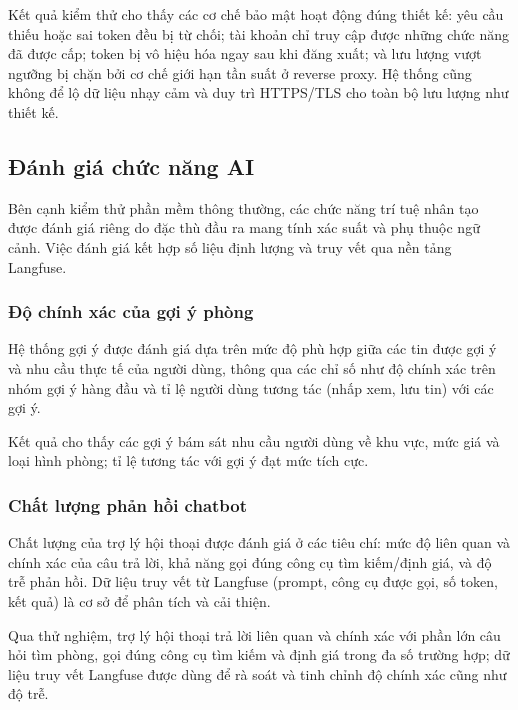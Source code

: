 Kết quả kiểm thử cho thấy các cơ chế bảo mật hoạt động đúng thiết kế: yêu cầu thiếu hoặc sai token đều bị từ chối; tài khoản chỉ truy cập được những chức năng đã được cấp; token bị vô hiệu hóa ngay sau khi đăng xuất; và lưu lượng vượt ngưỡng bị chặn bởi cơ chế giới hạn tần suất ở reverse proxy. Hệ thống cũng không để lộ dữ liệu nhạy cảm và duy trì HTTPS/TLS cho toàn bộ lưu lượng như thiết kế.

\FloatBarrier
\subsection{Đánh giá chức năng AI}

Bên cạnh kiểm thử phần mềm thông thường, các chức năng trí tuệ nhân tạo được đánh giá riêng do đặc thù đầu ra mang tính xác suất và phụ thuộc ngữ cảnh. Việc đánh giá kết hợp số liệu định lượng và truy vết qua nền tảng Langfuse.

\FloatBarrier
\subsubsection{Độ chính xác của gợi ý phòng}

Hệ thống gợi ý được đánh giá dựa trên mức độ phù hợp giữa các tin được gợi ý và nhu cầu thực tế của người dùng, thông qua các chỉ số như độ chính xác trên nhóm gợi ý hàng đầu và tỉ lệ người dùng tương tác (nhấp xem, lưu tin) với các gợi ý.

Kết quả cho thấy các gợi ý bám sát nhu cầu người dùng về khu vực, mức giá và loại hình phòng; tỉ lệ tương tác với gợi ý đạt mức tích cực.

\FloatBarrier
\subsubsection{Chất lượng phản hồi chatbot}

Chất lượng của trợ lý hội thoại được đánh giá ở các tiêu chí: mức độ liên quan và chính xác của câu trả lời, khả năng gọi đúng công cụ tìm kiếm/định giá, và độ trễ phản hồi. Dữ liệu truy vết từ Langfuse (prompt, công cụ được gọi, số token, kết quả) là cơ sở để phân tích và cải thiện.

Qua thử nghiệm, trợ lý hội thoại trả lời liên quan và chính xác với phần lớn câu hỏi tìm phòng, gọi đúng công cụ tìm kiếm và định giá trong đa số trường hợp; dữ liệu truy vết Langfuse được dùng để rà soát và tinh chỉnh độ chính xác cũng như độ trễ.
